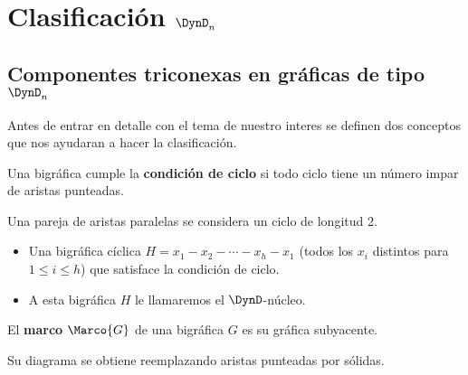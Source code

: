 \chapter{Clasificación $\DynD_{n}$}

\section{Componentes triconexas en gráficas de tipo $\DynD_{n}$}

Antes de entrar en detalle con el tema de nuestro interes se definen dos conceptos que nos ayudaran a hacer la clasificación.

\begin{definition}
Una bigráfica cumple la \textbf{condición de ciclo} si todo ciclo tiene un número impar de aristas punteadas.
\end{definition}

\begin{example}
    \centering
\end{example}

Una pareja de aristas paralelas se considera un ciclo de longitud 2.

\begin{itemize}
  \item Una bigráfica cíclica $ H = x_{1} - x_{2} - \cdots - x_{h}-x_{1}$ (todos los $x_{i}$ distintos para $ 1 \leq i \leq h$) que satisface la condición de ciclo.
  \item A esta bigráfica $H$ le llamaremos el $\DynD$-núcleo.
\end{itemize}

\begin{definition}
El \textbf{marco} $\Marco{G}$ de una bigráfica $G$ es su gráfica subyacente.
\end{definition}
Su diagrama se obtiene reemplazando aristas punteadas por sólidas.

